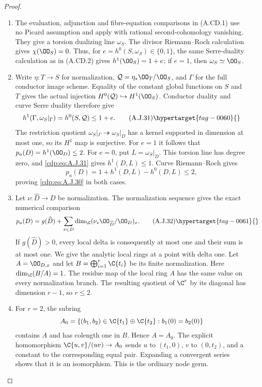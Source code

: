 \begin{proof}

\begin{enumerate}[label={$\langle1\rangle$\arabic*.},leftmargin=*]
\item The evaluation, adjunction and fibre-equation comparisons
in (A.CD.1) use no Picard assumption and apply with
rational second-cohomology vanishing. They give a torsion
dualizing line $\omega_S$. The divisor Riemann--Roch
calculation gives $\chi(\OO_S)=0$. Thus, for
$e=h^0(S,\omega_S)\in\{0,1\}$, the same Serre-duality
calculation as in (A.CD.2) gives
$h^1(\OO_S)=1+e$; if $e=1$, then
$\omega_S\simeq\OO_S$.

\item Write $\eta:T\to S$ for normalization,
$\mathcal Q=\eta_*\OO_T/\OO_S$, and $\Gamma$ for
the full conductor image scheme. Equality of the
constant global functions on $S$ and $T$ gives the
actual injection $H^0(\mathcal Q)\hookrightarrow
H^1(\OO_S)$. Conductor duality and curve Serre duality
therefore give
\[
 h^1(\Gamma,\omega_S|_\Gamma)
       =h^0(S,\mathcal Q)\le1+e.                  \tag{A.J.31}\hypertarget{tag-0060}{}\label{cdp:eq:A.J.31}
\]
The restriction quotient
$\omega_S|_\Gamma\twoheadrightarrow\omega_S|_D$
has a kernel supported in dimension at most one, so
its $H^1$ map is surjective. For $e=1$ it follows that
$p_a(D)=h^1(\OO_D)\le2$. For $e=0$, put
$L=\omega_S|_D$. This torsion line has degree zero,
and \eqref{cdp:eq:A.J.31} gives $h^1(D,L)\le1$. Curve
Riemann--Roch gives
\[
 p_a(D)=1+h^1(D,L)-h^0(D,L)\le2,
\]
proving \eqref{cdp:eq:A.J.30} in both cases.

\item Let $\nu:\widehat D\to D$ be normalization. The
normalization sequence gives the exact numerical
comparison
\[
 p_a(D)=g(\widehat D)+
        \sum_{x\in D}\dim_{\C}
          (\nu_*\OO_{\widehat D}/\OO_D)_x.       \tag{A.J.32}\hypertarget{tag-0061}{}\label{cdp:eq:A.J.32}
\]
If $g(\widehat D)>0$, every local delta is consequently
at most one and their sum is at most one. We give the
analytic local rings at a point with delta one.
Let $A=\OO_{D,x}$ and let
$B=\bigoplus_{i=1}^r\C\{t_i\}$ be its finite
normalization. Here $\dim_{\C}(B/A)=1$. The residue map
of the local ring $A$ has the same value on every
normalization branch. The resulting quotient of
$\C^r$ by its diagonal has dimension $r-1$, so
$r\le2$.

\item For $r=2$, the subring
\[
 A_0=\{(b_1,b_2)\in\C\{t_1\}\oplus\C\{t_2\}:
                                  b_1(0)=b_2(0)\}
\]
contains $A$ and has colength one in $B$. Hence
$A=A_0$. The explicit homomorphism
$\C\{u,v\}/(uv)\to A_0$ sends
$u$ to $(t_1,0)$, $v$ to $(0,t_2)$, and a constant
to the corresponding equal pair. Expanding a
convergent series shows that it is an isomorphism.
This is the ordinary node germ.


\end{enumerate}
\end{proof}
